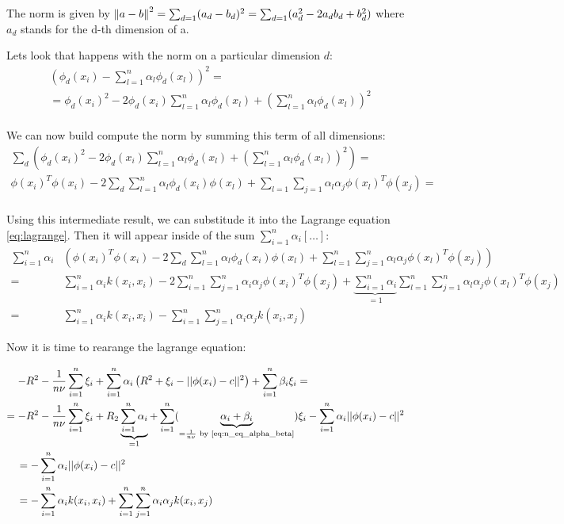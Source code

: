 The norm is given by $\left\lVert a - b\right\rVert^2 = \sum_{d=1} (a_d - b_d)^2
= \sum_{d=1} (a_d^2 - 2 a_d b_d + b_d^2 ) $ where $a_d$ stands for the d-th dimension of a.

Lets look that happens with the norm on a particular dimension $d$:
\begin{align}
    \label{eq:}
     &\left( \phi_d(x_{i})  - \sum_{l=1}^n \alpha_l \phi_d(x_l) \right)^2 =  \\
    & = \phi_d(x_i)^2 - 2 \phi_d(x_i) \sum_{l=1}^n \alpha_l \phi_d(x_l)
    + \left(\sum_{l=1}^n \alpha_l \phi_d(x_l) \right)^2  \\
\end{align}

We can now build compute the norm by summing this term of all dimensions:
\begin{align}
    \label{eq:}
    \sum_d \left( \phi_d(x_i)^2 - 2 \phi_d(x_i) \sum_{l=1}^n \alpha_l \phi_d(x_l)
    + \left(\sum_{l=1}^n \alpha_l \phi_d(x_l) \right)^2 \right) = \\
    \phi(x_i)^T \phi(x_i) - 2 \sum_d \sum_{l=1}^n \alpha_l \phi_d(x_i) \phi(x_l) +
     \sum_{l=1} \sum_{j=1} \alpha_l \alpha_j \phi(x_l)^T \phi(x_j) = \\
\end{align}

Using this intermediate result, we can substitude it into the Lagrange equation \eqref{eq:lagrange}.
Then it will appear inside of the sum  $\sum_{i=1}^n \alpha_i [\ldots]$:
\begin{align}
    \sum_{i=1}^n \alpha_i & \left(
    \phi(x_i)^T \phi(x_i) - 2 \sum_d \sum_{l=1}^n \alpha_l \phi_d(x_i) \phi(x_l) +
         \sum_{l=1}^n \sum_{j=1}^n \alpha_l \alpha_j \phi(x_l)^T \phi(x_j)
   \right) \\
    = & \sum_{i=1}^n \alpha_i k(x_i, x_i) - 2
    \sum_{i=1}^n \sum_{j=1}^n \alpha_i \alpha_j \phi(x_i)^T \phi(x_j) +
    \underbrace{\sum_{i=1}^n \alpha_i}_{=1} \sum_{l=1}^n \sum_{j=1}^n \alpha_l \alpha_j \phi(x_l)^T \phi(x_j) \\
    = & \sum_{i=1}^n \alpha_i k(x_i, x_i) -
    \sum_{i=1}^n \sum_{j=1}^n \alpha_i \alpha_j k(x_i, x_j)
\end{align}

Now it is time to rearange the lagrange equation:

\begin{align}
    \label{eq:}
    - R^2  & - \frac{1}{n \nu} \sum_{i=1}^n \xi_i
               + \sum_{i=1}^n \alpha_i \left( R^2 + \xi_i - ||\phi(x_i) - c||^2 \right)
            +  \sum_{i=1}^n \beta_i \xi_i = \\
    = - R^2  & - \frac{1}{n \nu} \sum_{i=1}^n \xi_i
               + R_2 \underbrace{\sum_{i=1}^n \alpha_i }_{= 1}
               + \sum_{i=1}^n ( \underbrace{\alpha_i + \beta_i}_{=\frac{1}{n\nu}
               \textrm{ by \eqref{eq:n_eq_alpha_beta}}} ) \xi_i
               - \sum_{i=1}^n \alpha_i ||\phi(x_i) - c||^2 \\
    = - & \sum_{i=1}^n \alpha_i ||\phi(x_i) - c||^2 \\
    = - & \sum_{i=1}^n \alpha_i k(x_i, x_i) +
    \sum_{i=1}^n \sum_{j=1}^n \alpha_i \alpha_j k(x_i, x_j)
\end{align}

